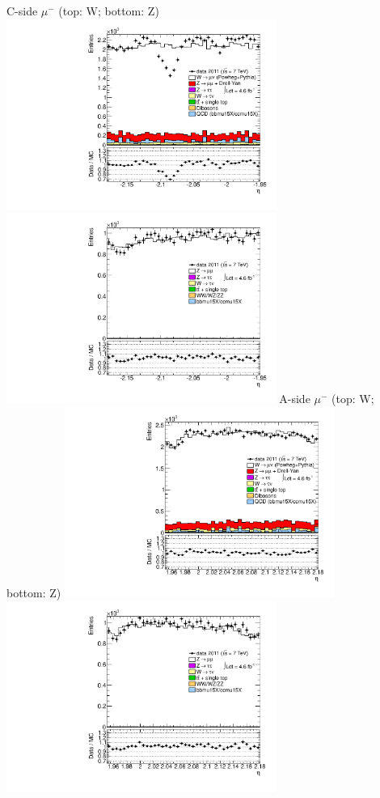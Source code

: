  {
\colb[T]
C-side $\mu^{-}$ (top: W; bottom: Z)
\centering
\includegraphics[width=0.66\textwidth]{dates/20130306/figures/both/WpLtoL_10_C_stack_l_eta_NEG} \\
\includegraphics[width=0.66\textwidth]{dates/20130306/figures/both/Z_10_C_stack_lN_eta_ALL.pdf}
A-side $\mu^{-}$ (top: W; bottom: Z)
\centering
\includegraphics[width=0.66\textwidth]{dates/20130306/figures/both/WpLtoL_10_A_stack_l_eta_NEG} \\
\includegraphics[width=0.66\textwidth]{dates/20130306/figures/both/Z_10_A_stack_lN_eta_ALL.pdf} 
\cole
}
